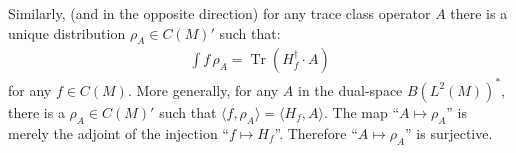 \documentclass[final,leqno]{siamart}
\newcommand{\pder}[2]{\ensuremath{\frac{ \partial #1}{\partial #2}}}
\DeclareMathOperator{\Tr}{Tr}
\begin{document}
Similarly, (and in the opposite direction) for any trace class operator $A$ there is a unique distribution $\rho_{A} \in C(M)'$ such that: 
\begin{align}
	 \int f \, \rho_{A} = \Tr ( H_{f}^{\dagger} \cdot A )
\end{align}
for any $f \in C(M)$.
More generally, for any $A$ in the dual-space $B( L^{2}(M) )^{*}$, there is a $\rho_{A} \in C(M)'$ such that $\langle f , \rho_{A} \rangle = \langle H_{f} , A \rangle$.
The map ``$A \mapsto \rho_{A}$'' is merely the adjoint of the injection ``$f \mapsto H_{f}$''. Therefore ``$A \mapsto \rho_{A}$'' is surjective.

\end{document}
